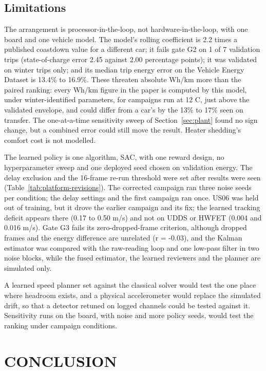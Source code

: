 \documentclass{ieeeaccess}
\begin{document}
\subsection{Limitations}

The arrangement is processor-in-the-loop, not hardware-in-the-loop, with one board and one vehicle model. The model's rolling coefficient is 2.2 times a published coastdown value for a different car; it fails gate G2 on 1 of 7 validation trips (state-of-charge error 2.45 against 2.00 percentage points); it was validated on winter trips only; and its median trip energy error on the Vehicle Energy Dataset is 13.4\% to 16.9\%. These threaten absolute Wh/km more than the paired ranking: every Wh/km figure in the paper is computed by this model, under winter-identified parameters, for campaigns run at 12 \textdegree{}C, just above the validated envelope, and could differ from a car's by the 13\% to 17\% seen on transfer. The one-at-a-time sensitivity sweep of Section~\ref{sec:plant} found no sign change, but a combined error could still move the result. Heater shedding's comfort cost is not modelled.

The learned policy is one algorithm, SAC, with one reward design, no hyperparameter sweep and one deployed seed chosen on validation energy. The delay exclusion and the 16-frame re-run threshold were set after results were seen (Table~\ref{tab:platform-revisions}). The corrected campaign ran three noise seeds per condition; the delay settings and the first campaign ran once. US06 was held out of training, but it drove the earlier campaign and its fix; the learned tracking deficit appears there (0.17 to 0.50 m/s) and not on UDDS or HWFET (0.004 and 0.016 m/s). Gate G3 fails its zero-dropped-frame criterion, although dropped frames and the energy difference are unrelated (r = -0.03), and the Kalman estimator was compared with the raw-reading loop and one low-pass filter in two noise blocks, while the fused estimator, the learned reviewers and the planner are simulated only.

A learned speed planner set against the classical solver would test the one place where headroom exists, and a physical accelerometer would replace the simulated drift, so that a detector retuned on logged channels could be tested against it. Sensitivity runs on the board, with noise and more policy seeds, would test the ranking under campaign conditions.

\section{CONCLUSION}
\label{sec:conclusion}
\end{document}
